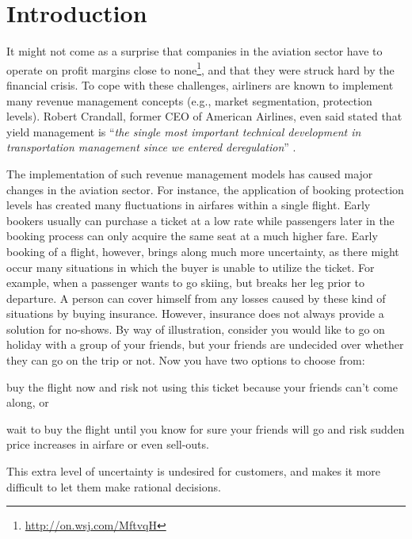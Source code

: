 \chapter{Introduction}
\label{chap:Introduction}

It might not come as a surprise that companies in the aviation sector have to operate on profit margins close to none\footnote{\url{http://on.wsj.com/MftvqH}}, and that they were struck hard by the financial crisis. To cope with these challenges, airliners are known to implement many revenue management concepts (e.g., market segmentation, protection levels). Robert Crandall, former CEO of American Airlines, even said stated that yield management is ``\emph{the single most important technical development in transportation management since we entered deregulation}'' \cite[p.~30]{cross97}.

The implementation of such revenue management models has caused major changes in the aviation sector. For instance, the application of booking protection levels has created many fluctuations in airfares within a single flight. Early bookers usually can purchase a ticket at a low rate while passengers later in the booking process can only acquire the same seat at a much higher fare. Early booking of a flight, however, brings along much more uncertainty, as there might occur many situations in which the buyer is unable to utilize the ticket. For example, when a passenger wants to go skiing, but breaks her leg prior to departure. A person can cover himself from any losses caused by these kind of situations by buying insurance. However, insurance does not always provide a solution for no-shows. By way of illustration, consider you would like to go on holiday with a group of your friends, but your friends are undecided over whether they can go on the trip or not. Now you have two options to choose from:
\begin{compactitem}
    \item buy the flight now and risk not using this ticket because your friends can't come along, or
    \item wait to buy the flight until you know for sure your friends will go and risk sudden price increases in airfare or even sell-outs.
\end{compactitem}
\noindent
This extra level of uncertainty is undesired for customers, and makes it more difficult to let them make rational decisions.

